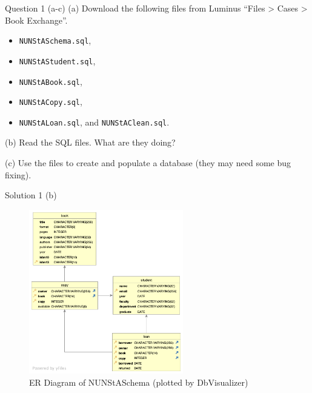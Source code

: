 \begin{frame}[fragile]{Question 1 (a-c)}
(a) Download the following files from Luminus ``Files > Cases > Book Exchange''.
\begin{itemize}
	\item[] \texttt{NUNStASchema.sql},
	\item[] \texttt{NUNStAStudent.sql},
	\item[] \texttt{NUNStABook.sql},
	\item[] \texttt{NUNStACopy.sql},
	\item[] \texttt{NUNStALoan.sql}, and \texttt{NUNStAClean.sql}.
\end{itemize}
\vspace{10pt}

(b) Read the SQL files. What are they doing? \vspace{10pt}

(c) Use the files to create and populate a database (they may need some bug fixing).
\end{frame}

\begin{frame}[fragile]{Solution 1 (b)}
\begin{figure}
\includegraphics[width=0.6\textwidth]{t1/images/t1-0.png}
\caption{ER Diagram of NUNStASchema (plotted by DbVisualizer)}
\end{figure}
\end{frame}

